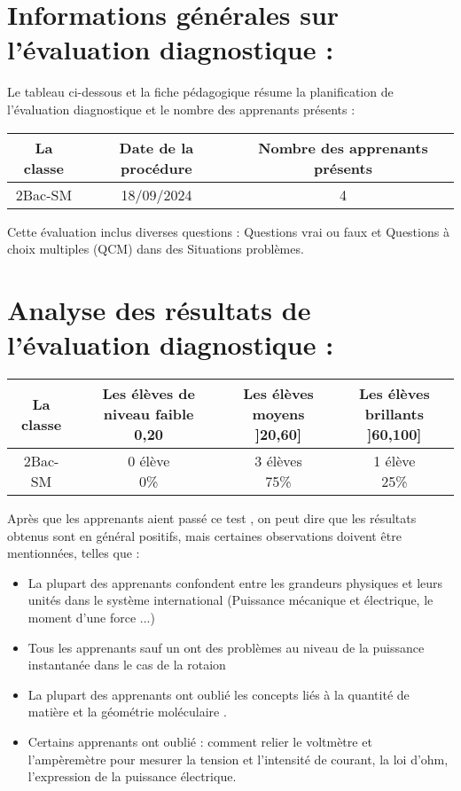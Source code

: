 \documentclass[12pt]{article}
\begin{document}
\section{Informations générales sur l’évaluation diagnostique :  }
Le tableau ci-dessous et la fiche pédagogique résume la planification de l’évaluation diagnostique et le nombre des apprenants présents :
\begin{center}
  \begin{tabular}{|c|c|c|}
	  \hline
	  La classe & Date de la procédure & Nombre des apprenants présents\\\hline
	  2Bac-SM & 18/09/2024 & 4\\\hline
\end{tabular}
\end{center}

Cette évaluation inclus diverses questions : Questions vrai ou faux et Questions à choix multiples (QCM) dans des Situations problèmes.
\section{Analyse des résultats de l’évaluation diagnostique : }

\begin{center}
  \begin{tabular}{|c|c|c|c|}
	  \hline
La classe & \makecell{Les élèves de niveau faible \\ 0,20} & \makecell{Les élèves moyens \\ ]20,60]}& \makecell{Les élèves brillants \\  ]60,100]} \\\hline
2Bac-SM & \makecell{0 élève \\ 0\%} & \makecell{3 élèves \\ 75\%}& \makecell{1 élève \\ 25\%} \\\hline
\end{tabular}
\end{center}


Après que les apprenants aient passé ce test , on peut dire que les résultats obtenus sont en général positifs, mais certaines observations doivent être mentionnées, telles que :

\begin{itemize}
	\item La plupart des apprenants confondent entre les grandeurs physiques et leurs unités dans le système international (Puissance mécanique et électrique, le moment d'une force ...)
	\item Tous les apprenants sauf un ont des problèmes au niveau de la puissance instantanée dans le cas de la rotaion 

	\item  La plupart des apprenants ont oublié les concepts liés à la quantité de matière et la géométrie moléculaire . 
	\item Certains apprenants ont oublié : comment relier le voltmètre et l’ampèremètre pour mesurer la tension et l’intensité de courant,  la loi d’ohm, l’expression de la puissance électrique.
\end{itemize}
\end{document}
